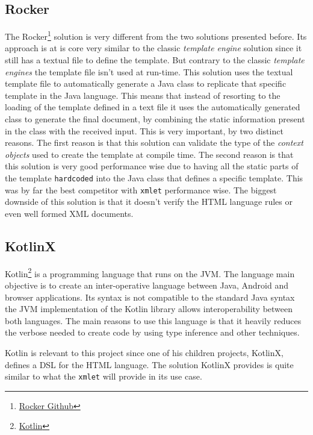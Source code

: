 \subsection{Rocker}
\label{sec:rocker}

The Rocker\footnote{\href{https://github.com/fizzed/rocker}{Rocker Github}} solution is very different from the two solutions presented before. Its approach is at is core very similar to the classic \textit{template engine} solution since it still has a textual file to define the template. But contrary to the classic \textit{template engines} the template file isn't used at run-time. This solution uses the textual template file to automatically generate a Java class to replicate that specific template in the Java language. This means that instead of resorting to the loading of the template defined in a text file it uses the automatically generated class to generate the final document, by combining the static information present in the class with the received input. This is very important, by two distinct reasons. The first reason is that this solution can validate the type of the \textit{context objects} used to create the template at compile time. The second reason is that this solution is very good performance wise due to having all the static parts of the template \texttt{hardcoded} into the Java class that defines a specific template. This was by far the best competitor with \texttt{xmlet} performance wise. The biggest downside of this solution is that it doesn't verify the \ac{HTML} language rules or even well formed \ac{XML} documents.

\subsection{KotlinX}
\label{sec:kotlinx}

Kotlin\footnote{\href{https://kotlinlang.org/}{Kotlin}} is a programming language that runs on the \ac{JVM}. The language main objective is to create an inter-operative language between Java, Android and browser applications. Its syntax is not compatible to the standard Java syntax the \ac{JVM} implementation of the Kotlin library allows interoperability between both languages. The main reasons to use this language is that it heavily reduces the verbose needed to create code by using type inference and other techniques. 

\noindent
Kotlin is relevant to this project since one of his children projects, KotlinX, defines a \ac{DSL} for the \ac{HTML} language. The solution KotlinX provides is quite similar to what the \texttt{xmlet} will provide in its use case. 


